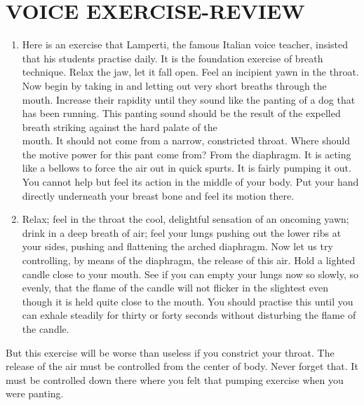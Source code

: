 \documentclass[10pt]{article}
\begin{document}
\section*{VOICE EXERCISE-REVIEW}
\begin{enumerate}
  \item Here is an exercise that Lamperti, the famous Italian voice teacher, insisted that his students practise daily. It is the foundation exercise of breath technique. Relax the jaw, let it fall open. Feel an incipient yawn in the throat. Now begin by taking in and letting out very short breaths through the mouth. Increase their rapidity until they sound like the panting of a dog that has been running. This panting sound should be the result of the expelled breath striking against the hard palate of the\\
mouth. It should not come from a narrow, constricted throat. Where should the motive power for this pant come from? From the diaphragm. It is acting like a bellows to force the air out in quick spurts. It is fairly pumping it out. You cannot help but feel its action in the middle of your body. Put your hand directly underneath your breast bone and feel its motion there.
  \item Relax; feel in the throat the cool, delightful sensation of an oncoming yawn; drink in a deep breath of air; feel your lungs pushing out the lower ribs at your sides, pushing and flattening the arched diaphragm. Now let us try controlling, by means of the diaphragm, the release of this air. Hold a lighted candle close to your mouth. See if you can empty your lungs now so slowly, so evenly, that the flame of the candle will not flicker in the slightest even though it is held quite close to the mouth. You should practise this until you can exhale steadily for thirty or forty seconds without disturbing the flame of the candle.
\end{enumerate}

But this exercise will be worse than useless if you constrict your throat. The release of the air must be controlled from the center of body. Never forget that. It must be controlled down there where you felt that pumping exercise when you were panting.
\end{document}
